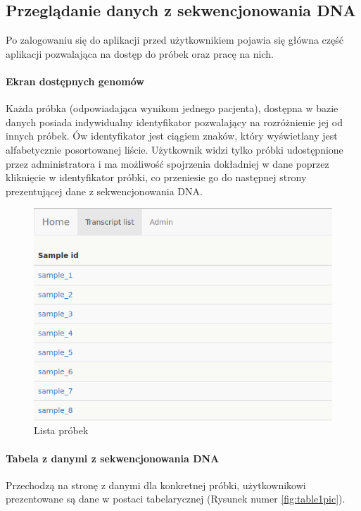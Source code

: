 \documentclass[a4paper,12pt,twoside]{article}
\begin{document}
\newpage
\subsection{Przeglądanie danych z sekwencjonowania DNA} \label{sssec:dnaPage}
Po zalogowaniu się do aplikacji przed użytkownikiem pojawia się główna część aplikacji pozwalająca na dostęp do próbek oraz pracę na nich.

\paragraph{Ekran dostępnych genomów}
Każda próbka (odpowiadająca wynikom jednego pacjenta), dostępna w bazie danych posiada indywidualny identyfikator pozwalający na
rozróżnienie jej od innych próbek. Ów identyfikator jest ciągiem znaków, który wyświetlany jest
alfabetycznie posortowanej liście. Użytkownik widzi tylko próbki udostępnione przez administratora
i ma możliwość spojrzenia dokładniej w dane poprzez kliknięcie w identyfikator próbki,
co przeniesie go do następnej strony prezentującej dane z sekwencjonowania DNA.

\begin{figure}[h!]
\includegraphics[width=\linewidth]{obrazy/aplikacja/sample_list.png}
\caption{Lista próbek}
\label{fig:sample_listpic}
\end{figure}

\newpage
\paragraph{Tabela z danymi z sekwencjonowania DNA}
Przechodzą na stronę z danymi dla konkretnej próbki, użytkownikowi prezentowane są
dane w postaci tabelarycznej (Rysunek numer \ref{fig:table1pic}).
\end{document}
